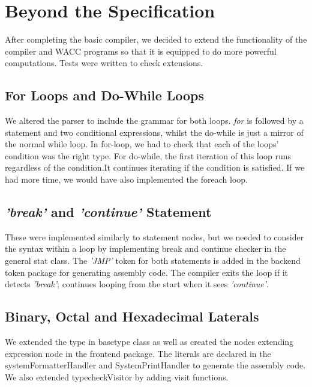 \documentclass[a4paper]{article}
\theoremstyle{definition}
\begin{document}
\section{Beyond the Specification}
After completing the basic compiler, we decided to extend the functionality of the compiler and WACC programs so that it is equipped to do more powerful computations. Tests were written to check extensions.

\subsection{For Loops and Do-While Loops}
We altered the parser to include the grammar for both loops. \textit{for} is followed by a statement and two conditional expressions, whilst the do-while is just a mirror of the normal while loop. In for-loop,  we had to check that each of the loops’ condition was the right type. For do-while, the first iteration of this loop runs regardless of the condition.It continues iterating if  the condition is satisfied. If we had more time, we would have also implemented the foreach loop.

\subsection{\textit{'break'} and \textit{'continue'} Statement}
These were implemented similarly to statement nodes, but we needed to consider the syntax within a loop by implementing break and continue checker in the general stat class. The \textit{'JMP'} token for both statements is added in the backend token package for generating assembly code. The compiler exits the loop if it detects \textit{'break'}; continues looping from the start when it sees \textit{'continue'}.

\subsection{Binary, Octal and  Hexadecimal Laterals}
We extended the type in basetype class as well as created the nodes extending expression node in the frontend package. The literals are declared in the systemFormatterHandler and SystemPrintHandler to generate the assembly code. We also extended typecheckVisitor by adding visit functions.
\end{document}
